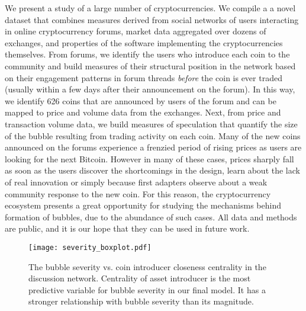 We present a study of a large number of cryptocurrencies.
We compile a a novel dataset that combines measures derived from social networks of users interacting in online cryptocurrency forums, market data aggregated over dozens of exchanges, and properties of the software implementing the cryptocurrencies themselves.
From forums, we identify the users who introduce each coin to the community and build measures of their structural position in the network based on
their engagement patterns in forum threads \emph{before} the coin is ever traded (usually within a few days after their announcement on the forum).
In this way, we identify 626 coins that are announced by users of the forum and can be mapped to price and volume data from the exchanges.
Next, from price and transaction volume data, we build measures of speculation that quantify the size of the bubble resulting from trading activity on each coin. 
Many of the new coins announced on the forums experience a frenzied period of rising prices as users are looking for the next Bitcoin. However in many of these cases, prices sharply fall as soon as the users discover the shortcomings in the design, learn about the lack of real innovation or simply because first adapters observe about a weak community response to the new coin. For this reason, the cryptocurrency ecosystem presents a great opportunity for studying the mechanisms behind formation of bubbles, due to the abundance of such cases.
All data and methods are public, and it is our hope that they can be used in future work.


\begin{figure}
\centering
\texttt{[image: severity\_boxplot.pdf]}
\caption{The bubble severity vs. coin introducer closeness centrality in the discussion network. Centrality of asset introducer is the most predictive variable for bubble severity in our final model. It has a stronger relationship with bubble severity than its magnitude.}
\label{severity_boxplot}
\end{figure}

